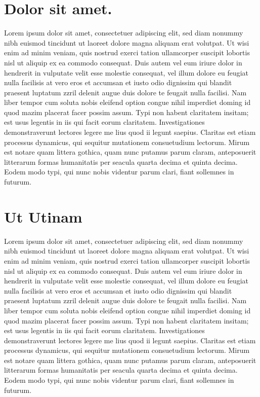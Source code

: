 \documentclass[letterpaper, 10pt, twocolumn]{article}
\begin{document}
\section{Dolor sit amet.}

Lorem ipsum dolor sit amet, consectetuer adipiscing elit, sed diam nonummy nibh euismod tincidunt ut laoreet dolore magna aliquam erat volutpat. Ut wisi enim ad minim veniam, quis nostrud exerci tation ullamcorper suscipit lobortis nisl ut aliquip ex ea commodo consequat. Duis autem vel eum iriure dolor in hendrerit in vulputate velit esse molestie consequat, vel illum dolore eu feugiat nulla facilisis at vero eros et accumsan et iusto odio dignissim qui blandit praesent luptatum zzril delenit augue duis dolore te feugait nulla facilisi. Nam liber tempor cum soluta nobis eleifend option congue nihil imperdiet doming id quod mazim placerat facer possim assum. Typi non habent claritatem insitam; est usus legentis in iis qui facit eorum claritatem. Investigationes demonstraverunt lectores legere me lius quod ii legunt saepius. Claritas est etiam processus dynamicus, qui sequitur mutationem consuetudium lectorum. Mirum est notare quam littera gothica, quam nunc putamus parum claram, anteposuerit litterarum formas humanitatis per seacula quarta decima et quinta decima. Eodem modo typi, qui nunc nobis videntur parum clari, fiant sollemnes in futurum.

\section{Ut Utinam}
Lorem ipsum dolor sit amet, consectetuer adipiscing elit, sed diam nonummy nibh euismod tincidunt ut laoreet dolore magna aliquam erat volutpat. Ut wisi enim ad minim veniam, quis nostrud exerci tation ullamcorper suscipit lobortis nisl ut aliquip ex ea commodo consequat. Duis autem vel eum iriure dolor in hendrerit in vulputate velit esse molestie consequat, vel illum dolore eu feugiat nulla facilisis at vero eros et accumsan et iusto odio dignissim qui blandit praesent luptatum zzril delenit augue duis dolore te feugait nulla facilisi. Nam liber tempor cum soluta nobis eleifend option congue nihil imperdiet doming id quod mazim placerat facer possim assum. Typi non habent claritatem insitam; est usus legentis in iis qui facit eorum claritatem. Investigationes demonstraverunt lectores legere me lius quod ii legunt saepius. Claritas est etiam processus dynamicus, qui sequitur mutationem consuetudium lectorum. Mirum est notare quam littera gothica, quam nunc putamus parum claram, anteposuerit litterarum formas humanitatis per seacula quarta decima et quinta decima. Eodem modo typi, qui nunc nobis videntur parum clari, fiant sollemnes in futurum.



\end{document}
